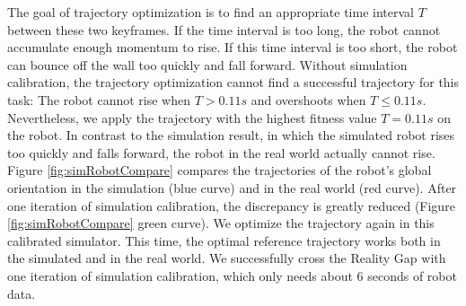 The goal of trajectory optimization is to find an appropriate time interval $T$ between these two keyframes. If the time interval is too long, the robot cannot accumulate enough momentum to rise. If this time interval is too short, the robot can bounce off the wall too quickly and fall forward. Without simulation calibration, the trajectory optimization cannot find a successful trajectory for this task: The robot cannot rise when $T > 0.11s$ and overshoots when $T \leq 0.11s$. Nevertheless, we apply the trajectory with the highest fitness value $T=0.11s$ on the robot. In contrast to the simulation result, in which the simulated robot rises too quickly and falls forward, the robot in the real world actually cannot rise. Figure \ref{fig:simRobotCompare} compares the trajectories of the robot's global orientation in the simulation (blue curve) and in the real world (red curve). After one iteration of simulation calibration, the discrepancy is greatly reduced (Figure \ref{fig:simRobotCompare} green curve). We optimize the trajectory again in this calibrated simulator. This time, the optimal reference trajectory works both in the simulated and in the real world. We successfully cross the Reality Gap with one iteration of simulation calibration, which only needs about 6 seconds of robot data.



